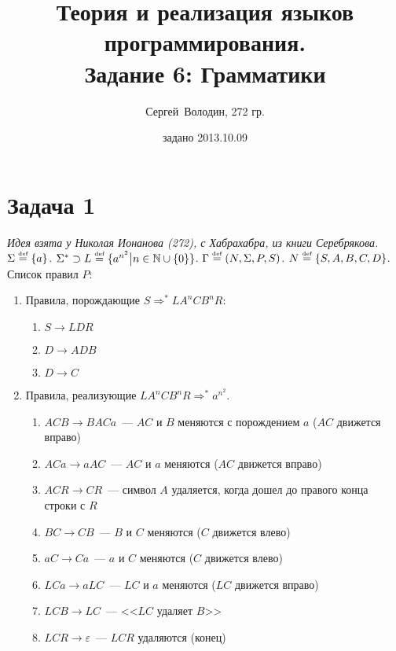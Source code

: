 \documentclass[a4paper]{article}
\title{Теория и реализация языков программирования.\\Задание 6: Грамматики}
\date{задано 2013.10.09}
\author{Сергей~Володин, 272 гр.}
\def\eqdef{\overset{\mbox{\tiny def}}{=}}
\begin{document}
\maketitle
\section*{Задача 1}
{\em Идея взята у Николая Ионанова (272), с Хабрахабра, из книги Серебрякова.}\newline
$\Sigma\eqdef\{a\}$. $\Sigma^*\supset L\eqdef\{a^{n^2}\big|n\in{\mathbb N}\cup \{0\} \}$. $\Gamma\eqdef (N,\Sigma,P,S)$. $N\eqdef \{S,A,B,C,D\}$. Список правил $P$:
\begin{enumerate}[(1)]
\item Правила, порождающие $S\Longrightarrow^* LA^nCB^nR$:\begin{enumerate}[1.]
\item \label{rS} $S\longrightarrow LDR$
\item \label{rDAB} $D\longrightarrow ADB$
\item \label{rDeps} $D\longrightarrow C$
\end{enumerate}
\item Правила, реализующие $LA^nCB^nR\Longrightarrow^* a^{n^2}$.\begin{enumerate}[1.]
\item \label{rACB} $ACB \longrightarrow BACa$~--- $AC$ и $B$ меняются с порождением $a$ ($AC$ движется вправо)
\item \label{rACa} $ACa \longrightarrow aAC$~--- $AC$ и $a$ меняются ($AC$ движется вправо)
\item \label{rACR} $ACR \longrightarrow CR$~--- символ $A$ удаляется, когда дошел до правого конца строки с $R$
\item \label{rBC}  $BC \longrightarrow CB$~--- $B$ и $C$ меняются ($C$ движется влево)
\item \label{raC}  $aC \longrightarrow Ca$~--- $a$ и $C$ меняются ($C$ движется влево)
\item \label{rLCa} $LCa \longrightarrow aLC$~--- $LC$ и $a$ меняются ($LC$ движется вправо)
\item \label{rLCB} $LCB \longrightarrow LC$~--- <<$LC$ удаляет $B$>>
\item \label{rLCR} $LCR \longrightarrow \varepsilon$~--- $LCR$ удаляются (конец)
\end{enumerate}
\end{enumerate}
\end{document}
